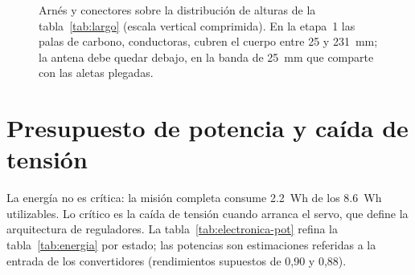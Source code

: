 \begin{figure}[H]
\caption{Arnés y conectores sobre la distribución de alturas de la
tabla~\ref{tab:largo} (escala vertical comprimida). En la etapa~1 las palas de carbono,
conductoras, cubren el cuerpo entre 25 y \SI{231}{mm}; la antena debe quedar debajo, en la banda de
\SI{25}{mm} que comparte con las aletas plegadas.}
\label{fig:electronica-arnes}
\end{figure}

\section{Presupuesto de potencia y caída de tensión}\label{sec:electronica-pot}

La energía no es crítica: la misión completa consume \SI{2.2}{Wh} de los \SI{8.6}{Wh}
utilizables. Lo crítico es la caída de tensión cuando arranca el servo, que define la
arquitectura de reguladores. La tabla~\ref{tab:electronica-pot} refina la
tabla~\ref{tab:energia} por estado; las potencias son estimaciones referidas a la entrada de
los convertidores (rendimientos supuestos de 0,90 y 0,88).

